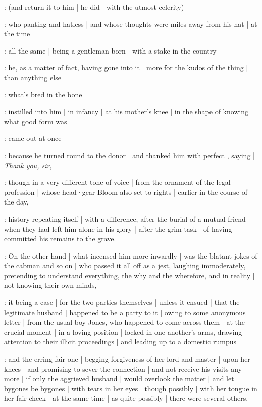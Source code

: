 :
(and return it to him |
he did |
with the utmost celerity)

:
who panting and hatless |
and whose thoughts were miles away from his hat |
at the time

:
all the same |
being a gentleman born |
with a stake in the country

:
he,
as a matter of fact,
having gone into it |
more for the kudos of the thing |
than anything else

:
what's bred in the bone%

:
instilled into him |
in infancy |
at his mother's knee |
in the shape of knowing what good form was

:
came out at once

:
because he turned round to the donor |
and thanked him with perfect ,
saying |
\emph{Thank you, sir},

:
though in a very different tone of voice |
from the ornament of the legal profession |
whose head·gear Bloom also set to rights |
earlier in the course of the day,

:
history repeating itself |
with a difference,
after the burial of a mutual friend |
when they had left him alone in his glory |
after the grim task |
of having committed his remains to the grave.

:
On the other hand |
what incensed him more inwardly |
was the blatant jokes of the cabman and so on |
who passed it all off as a jest,
laughing immoderately,
pretending to understand everything,
the why and the wherefore,
and in reality |
not knowing their own minds,

:
it being a case |
for the two parties themselves |
unless it ensued |
that the legitimate husband |
happened to be a party to it |
owing to some anonymous letter |
from the usual boy Jones,
who happened to come across them |
at the crucial moment |
in a loving position |
locked in one another's arms,
drawing attention to their illicit proceedings |
and leading up to a domestic rumpus

:
and the erring fair one |
begging forgiveness of her lord and master |
upon her knees |
and promising to sever the connection |
and not receive his visits any more |
if only the aggrieved husband |
would overlook the matter |
and let bygones be bygones |
with tears in her eyes |
though possibly |
with her tongue in her fair cheek |
at the same time |
as quite possibly |
there were several others.

